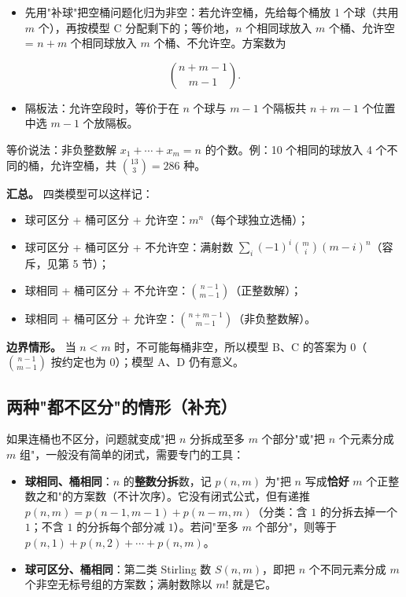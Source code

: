 \begin{itemize}
\item 先用"补球"把空桶问题化归为非空：若允许空桶，先给每个桶放 1 个球（共用 $m$ 个），再按模型 C 分配剩下的；等价地，$n$ 个相同球放入 $m$ 个桶、允许空 = $n+m$ 个相同球放入 $m$ 个桶、不允许空。方案数为
\end{itemize}


\[
\binom{n+m-1}{m-1}.
\]

\begin{itemize}
\item 隔板法：允许空段时，等价于在 $n$ 个球与 $m-1$ 个隔板共 $n+m-1$ 个位置中选 $m-1$ 个放隔板。
\end{itemize}


等价说法：非负整数解 $x_1+\cdots+x_m=n$ 的个数。例：10 个相同的球放入 4 个不同的桶，允许空桶，共 $\binom{13}{3}=286$ 种。

\textbf{汇总。} 四类模型可以这样记：

\begin{itemize}
\item 球可区分 + 桶可区分 + 允许空：$m^n$（每个球独立选桶）；
\item 球可区分 + 桶可区分 + 不允许空：满射数 $\sum_i(-1)^i\binom mi(m-i)^n$（容斥，见第 5 节）；
\item 球相同 + 桶可区分 + 不允许空：$\binom{n-1}{m-1}$（正整数解）；
\item 球相同 + 桶可区分 + 允许空：$\binom{n+m-1}{m-1}$（非负整数解）。
\end{itemize}


\textbf{边界情形。} 当 $n<m$ 时，不可能每桶非空，所以模型 B、C 的答案为 $0$（$\binom{n-1}{m-1}$ 按约定也为 $0$）；模型 A、D 仍有意义。

\subsection{两种"都不区分"的情形（补充）}


如果连桶也不区分，问题就变成"把 $n$ 分拆成至多 $m$ 个部分"或"把 $n$ 个元素分成 $m$ 组"，一般没有简单的闭式，需要专门的工具：

\begin{itemize}
\item \textbf{球相同、桶相同}：$n$ 的\textbf{整数分拆}数，记 $p(n,m)$ 为"把 $n$ 写成\textbf{恰好} $m$ 个正整数之和"的方案数（不计次序）。它没有闭式公式，但有递推 $p(n,m)=p(n-1,m-1)+p(n-m,m)$（分类：含 $1$ 的分拆去掉一个 $1$；不含 $1$ 的分拆每个部分减 $1$）。若问"至多 $m$ 个部分"，则等于 $p(n,1)+p(n,2)+\cdots+p(n,m)$。
\item \textbf{球可区分、桶相同}：第二类 Stirling 数 $S(n,m)$，即把 $n$ 个不同元素分成 $m$ 个非空无标号组的方案数；满射数除以 $m!$ 就是它。
\end{itemize}


